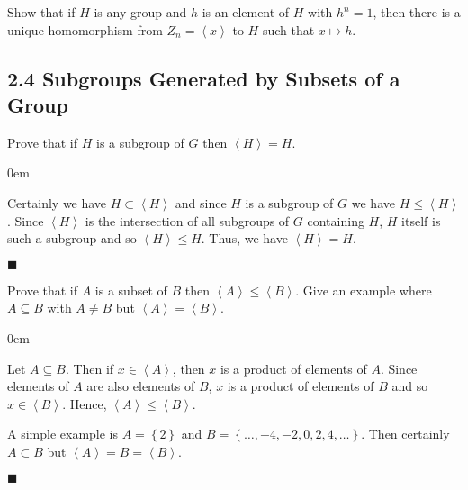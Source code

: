 \documentclass[12pt]{article}
\renewcommand{\qed}{\hfill$\blacksquare$}
\renewenvironment{proof}{\begin{addmargin}[1em]{0em}\begin{newproof}}{\end{newproof}\end{addmargin}\qed}
\newenvironment{problem}[2][Exercise]{\begin{trivlist}
\item[\hskip \labelsep {\bfseries #1}\hskip \labelsep {\bfseries #2.}]}{\end{trivlist}}
\begin{document}
\begin{problem}{2.3.18}
Show that if $H$ is any group and $h$ is an element of $H$ with $h^n=1$, then there is a unique homomorphism from $Z_n=\left\langle x\right\rangle$ to $H$ such that $x\mapsto h$.
\end{problem}








\subsection*{2.4 Subgroups Generated by Subsets of a Group}

\begin{problem}{2.4.1}
Prove that if $H$ is a subgroup of $G$ then $\left\langle H\right\rangle = H$.
\end{problem}
\begin{proof}
Certainly we have $H\subset \left\langle H\right\rangle $ and since $H$ is a subgroup of $G$ we have $H \leq \left\langle H\right\rangle $. Since $\left\langle H\right\rangle$ is the intersection of all subgroups of $G$ containing $H$, $H$ itself is such a subgroup and so $\left\langle H \right\rangle \leq H$. Thus, we have $\left\langle H\right\rangle = H$.
\end{proof}

\begin{problem}{2.4.2}
Prove that if $A$ is a subset of $B$ then $\left\langle A\right\rangle \leq \left\langle B\right\rangle$. Give an example where $A\subseteq B$ with $A\neq B$ but $\left\langle A\right\rangle = \left\langle B\right\rangle$.
\end{problem}
\begin{proof}
Let $A\subseteq B$. Then if $x\in \left\langle A\right\rangle$, then $x$ is a product of elements of $A$. Since elements of $A$ are also elements of $B$, $x$ is a product of elements of $B$ and so $x\in \left\langle B\right\rangle$. Hence, $\left\langle A\right\rangle \leq \left\langle B\right\rangle$.

A simple example is $A = \left\{ 2\right\}$ and $B = \left\{ \ldots,-4,-2,0,2,4,\ldots \right\}$. Then certainly $A\subset B$ but $\left\langle A\right\rangle = B = \left\langle B\right\rangle$.
\end{proof}
\end{document}
